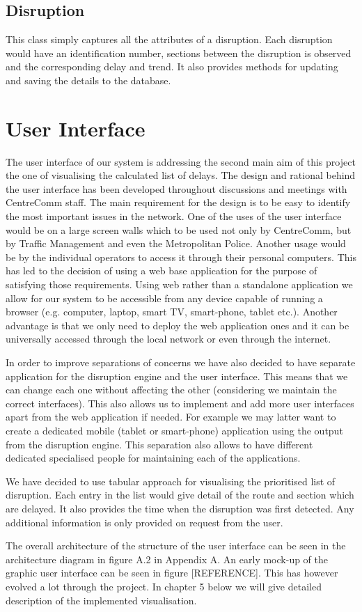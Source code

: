 \subsection{Disruption}
This class simply captures all the attributes of a disruption. Each disruption would have an identification number, sections between the disruption is observed and the corresponding delay and trend. It also provides methods for updating and saving the details to the database.

\section{User Interface}
The user interface of our system is addressing the second main aim of this project the one of visualising the calculated list of delays. The design and rational behind the user interface has been developed throughout discussions and meetings with CentreComm staff. The main requirement for the design is to be easy to identify the most important issues in the network. One of the uses of the user interface would be on a large screen walls which to be used not only by CentreComm, but by Traffic Management and even the Metropolitan Police. Another usage would be by the individual operators to access it through their personal computers. This has led to the decision of using a web base application for the purpose of satisfying those requirements. Using web rather than a standalone application we allow for our system to be accessible from any device capable of running a browser (e.g. computer, laptop, smart TV, smart-phone, tablet etc.). Another advantage is that we only need to deploy the web application ones and it can be universally accessed through the local network or even through the internet.

In order to improve separations of concerns we have also decided to have separate application for the disruption engine and the user interface. This means that we can change each one without affecting the other (considering we maintain the correct interfaces). This also allows us to implement and add more user interfaces apart from the web application if needed. For example we may latter want to create a dedicated mobile (tablet or smart-phone) application using the output from the disruption engine. This separation also allows to have different dedicated specialised people for maintaining each of the applications.

We have decided to use tabular approach for visualising the prioritised list of disruption. Each entry in the list would give detail of the route and section which are delayed. It also provides the time when the disruption was first detected. Any additional information is only provided on request from the user.

The overall architecture of the structure of the user interface can be seen in the architecture diagram in figure A.2 in Appendix A. An early mock-up of the graphic user interface can be seen in figure [REFERENCE]. This has however evolved a lot through the project. In chapter 5 below we will give detailed description of the implemented visualisation.


